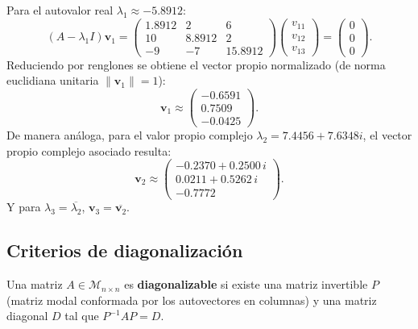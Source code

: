 \documentclass[spanish,letterpaper,oneside]{article}
\begin{document}
Para el autovalor real $\lambda_1 \approx -5.8912$:
\begin{equation}
(A - \lambda_1 I)\mathbf{v}_1 = \begin{pmatrix}
1.8912 & 2 & 6 \\
10 & 8.8912 & 2 \\
-9 & -7 & 15.8912
\end{pmatrix} \begin{pmatrix} v_{11} \\ v_{12} \\ v_{13} \end{pmatrix} = \begin{pmatrix} 0 \\ 0 \\ 0 \end{pmatrix}.
\end{equation}
Reduciendo por renglones se obtiene el vector propio normalizado (de norma euclidiana unitaria $\|\mathbf{v}_1\| = 1$):
\begin{equation}
\mathbf{v}_1 \approx \begin{pmatrix} -0.6591 \\ 0.7509 \\ -0.0425 \end{pmatrix}.
\end{equation}
De manera análoga, para el valor propio complejo $\lambda_2 = 7.4456 + 7.6348i$, el vector propio complejo asociado resulta:
\begin{equation}
\mathbf{v}_2 \approx \begin{pmatrix} -0.2370 + 0.2500\,i \\ 0.0211 + 0.5262\,i \\ -0.7772 \end{pmatrix}.
\end{equation}
Y para $\lambda_3 = \overline{\lambda_2}$, $\mathbf{v}_3 = \overline{\mathbf{v}_2}$.

\subsection{Criterios de diagonalización}
Una matriz $A \in \mathcal{M}_{n \times n}$ es \textbf{diagonalizable} si existe una matriz invertible $P$ (matriz modal conformada por los autovectores en columnas) y una matriz diagonal $D$ tal que $P^{-1} A P = D$. 
\end{document}
